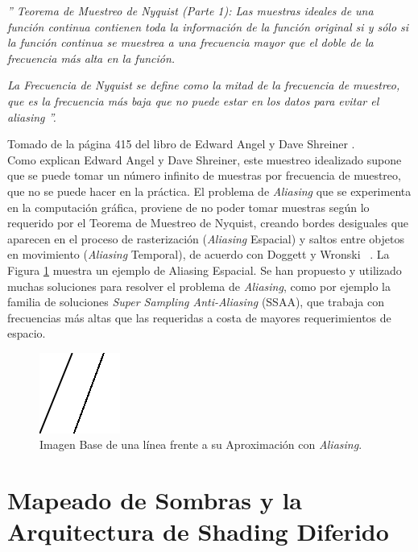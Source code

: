 \documentclass[pregrado]{tesis-usb} %
\begin{document}
\emph{'' Teorema de Muestreo de Nyquist (Parte 1): Las muestras ideales de una función continua contienen toda la información de la función original si y sólo si la función continua se muestrea a una frecuencia mayor que el doble de la frecuencia más alta en la función. }

\emph{La Frecuencia de Nyquist se define como la mitad de la frecuencia de muestreo, que es la frecuencia más baja que no puede estar en los datos para evitar el \textit{aliasing} ''.
} 


Tomado de la página 415 del libro de Edward Angel y Dave Shreiner \cite{Shreiner2011}.  \\

Como explican Edward Angel y Dave Shreiner, este muestreo idealizado supone que se puede tomar un número infinito de muestras por frecuencia de muestreo, que no se puede  hacer en la práctica. El problema de \textit{Aliasing} que se experimenta en la computación gráfica, proviene de no poder tomar muestras según lo requerido por el Teorema de Muestreo de Nyquist, creando bordes desiguales que aparecen en el proceso de rasterización (\textit{Aliasing} Espacial) y saltos entre objetos en movimiento (\textit{Aliasing} Temporal), de acuerdo con Doggett y Wronski ~\cite{Doggett2017EDAN35, Wronski2014}. La Figura \ref{fig:aliasingexample} muestra un ejemplo de Aliasing Espacial. Se han propuesto y utilizado muchas soluciones para resolver el problema de \textit{Aliasing}, como por ejemplo la familia de soluciones \textit{Super Sampling Anti-Aliasing} (SSAA), que trabaja con frecuencias más altas que las requeridas a costa de mayores requerimientos de espacio.

\begin{figure}[!hbt]
	\centering
	\includegraphics[scale=0.6]{images/aliasing_example.png} 
	\caption{Imagen Base de una línea frente a su Aproximación con \textit{Aliasing}.}\label{fig:aliasingexample}
\end{figure}

\section[Mapeado de Sombras y la Arquitectura de Shading Diferido]{Mapeado de Sombras y la Arquitectura de Shading Diferido}
\end{document}
